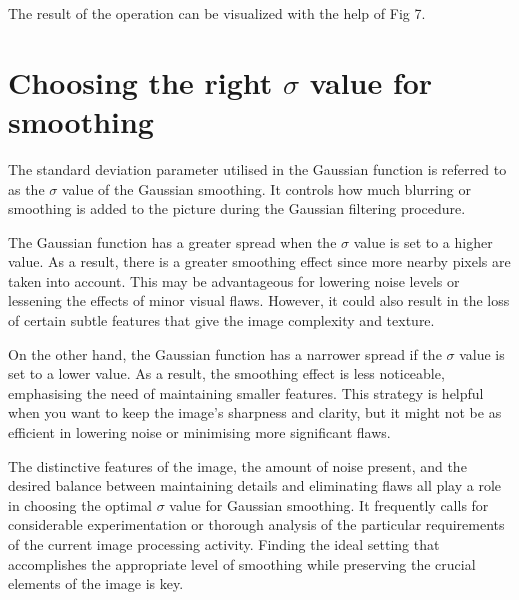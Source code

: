 \documentclass{70_styles/svproc}
\begin{document}
The result of the operation can be visualized with the help of Fig 7.

\section{Choosing the right $\sigma$ value for smoothing}
The standard deviation parameter utilised in the Gaussian function is referred to as the $\sigma$ value of the Gaussian smoothing. It controls how much blurring or smoothing is added to the picture during the Gaussian filtering procedure.

The Gaussian function has a greater spread when the $\sigma$ value is set to a higher value. As a result, there is a greater smoothing effect since more nearby pixels are taken into account. This may be advantageous for lowering noise levels or lessening the effects of minor visual flaws. However, it could also result in the loss of certain subtle features that give the image complexity and texture.

On the other hand, the Gaussian function has a narrower spread if the $\sigma$ value is set to a lower value. As a result, the smoothing effect is less noticeable, emphasising the need of maintaining smaller features. This strategy is helpful when you want to keep the image's sharpness and clarity, but it might not be as efficient in lowering noise or minimising more significant flaws.

The distinctive features of the image, the amount of noise present, and the desired balance between maintaining details and eliminating flaws all play a role in choosing the optimal $\sigma$ value for Gaussian smoothing. It frequently calls for considerable experimentation or thorough analysis of the particular requirements of the current image processing activity. Finding the ideal setting that accomplishes the appropriate level of smoothing while preserving the crucial elements of the image is key.
\end{document}
